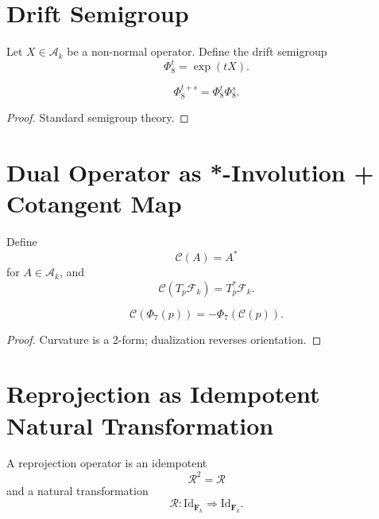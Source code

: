\section{Drift Semigroup}

\begin{definition}
Let $X \in \mathcal{A}_k$ be a non-normal operator. Define the drift semigroup
\[
\Phi_8^t = \exp(tX).
\]
\end{definition}

\begin{lemma}
\[
\Phi_8^{t+s} = \Phi_8^t \Phi_8^s.
\]
\end{lemma}

\begin{proof}
Standard semigroup theory.
\end{proof}

\section{Dual Operator as *-Involution + Cotangent Map}

\begin{definition}
Define
\[
\mathcal{C}(A) = A^\ast
\]
for $A \in \mathcal{A}_k$, and
\[
\mathcal{C}(T_p\mathcal{F}_k) = T_p^\ast\mathcal{F}_k.
\]
\end{definition}

\begin{lemma}
\[
\mathcal{C}(\Phi_7(p)) = -\Phi_7(\mathcal{C}(p)).
\]
\end{lemma}

\begin{proof}
Curvature is a 2-form; dualization reverses orientation.
\end{proof}

\section{Reprojection as Idempotent Natural Transformation}

\begin{definition}[Reprojection]
A reprojection operator is an idempotent
\[
\mathcal{R}^2 = \mathcal{R}
\]
and a natural transformation
\[
\mathcal{R} : \mathrm{Id}_{\mathbf{F}_k} \Rightarrow \mathrm{Id}_{\mathbf{F}_k}.
\]
\end{definition}

